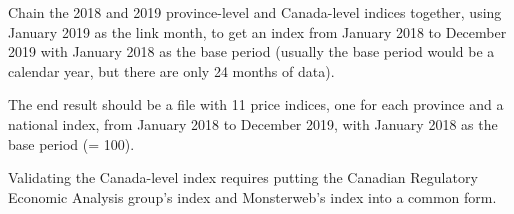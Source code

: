 \documentclass[]{article}
\newenvironment{Shaded}{\begin{snugshade}}{\end{snugshade}}
\newcommand{\CommentTok}[1]{\textcolor[rgb]{0.56,0.35,0.01}{\textit{#1}}}
\newcommand{\DataTypeTok}[1]{\textcolor[rgb]{0.13,0.29,0.53}{#1}}
\newcommand{\KeywordTok}[1]{\textcolor[rgb]{0.13,0.29,0.53}{\textbf{#1}}}
\newcommand{\NormalTok}[1]{#1}
\newcommand{\OperatorTok}[1]{\textcolor[rgb]{0.81,0.36,0.00}{\textbf{#1}}}
\newcommand{\StringTok}[1]{\textcolor[rgb]{0.31,0.60,0.02}{#1}}
\begin{document}
\begin{enumerate}
  Chain the 2018 and 2019 province-level and Canada-level indices together, using January 2019 as the link month, to get an index from January 2018 to December 2019 with January 2018 as the base period (usually the base period would be a calendar year, but there are only 24 months of data).

\begin{Shaded}
\end{Shaded}
\end{enumerate}

The end result should be a file with 11 price indices, one for each province and a national index, from January 2018 to December 2019, with January 2018 as the base period (= 100).

Validating the Canada-level index requires putting the Canadian Regulatory Economic Analysis group's index and Monsterweb's index into a common form.
\end{document}
